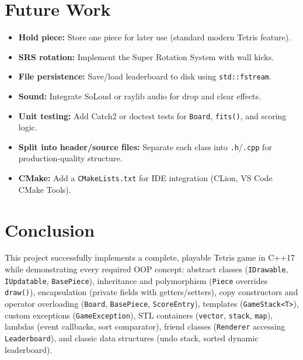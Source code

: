 \documentclass[11pt]{article}
\begin{document}
\section{Future Work}

\begin{itemize}
    \item \textbf{Hold piece:} Store one piece for later use (standard modern Tetris feature).
    \item \textbf{SRS rotation:} Implement the Super Rotation System with wall kicks.
    \item \textbf{File persistence:} Save/load leaderboard to disk using \texttt{std::fstream}.
    \item \textbf{Sound:} Integrate SoLoud or raylib audio for drop and clear effects.
    \item \textbf{Unit testing:} Add Catch2 or doctest tests for \texttt{Board}, \texttt{fits()}, and scoring logic.
    \item \textbf{Split into header/source files:} Separate each class into \texttt{.h}/\texttt{.cpp} for production-quality structure.
    \item \textbf{CMake:} Add a \texttt{CMakeLists.txt} for IDE integration (CLion, VS Code CMake Tools).
\end{itemize}

\section{Conclusion}

\begin{infobox}
This project successfully implements a complete, playable Tetris game in C++17 while
demonstrating every required OOP concept:
abstract classes (\texttt{IDrawable}, \texttt{IUpdatable}, \texttt{BasePiece}),
inheritance and polymorphism (\texttt{Piece} overrides \texttt{draw()}),
encapsulation (private fields with getters/setters),
copy constructors and operator overloading (\texttt{Board}, \texttt{BasePiece}, \texttt{ScoreEntry}),
templates (\texttt{GameStack<T>}),
custom exceptions (\texttt{GameException}),
STL containers (\texttt{vector}, \texttt{stack}, \texttt{map}),
lambdas (event callbacks, sort comparator),
friend classes (\texttt{Renderer} accessing \texttt{Leaderboard}),
and classic data structures (undo stack, sorted dynamic leaderboard).
\end{infobox}
\end{document}
